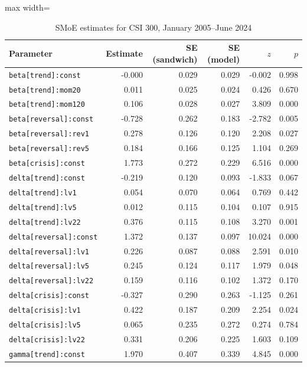 \begin{table}[!htbp]\centering\scriptsize
\caption{SMoE estimates for CSI 300, January 2005--June 2024}\label{tab:csi300_params}
\begin{adjustbox}{max width=\textwidth}
\begin{tabular}{lrrrrr}
\toprule
Parameter & Estimate & SE (sandwich) & SE (model) & $z$ & $p$\\
\midrule
\texttt{beta[trend]:const} & -0.000 & 0.029 & 0.029 & -0.002 & 0.998\\
\texttt{beta[trend]:mom20} & 0.011 & 0.025 & 0.024 & 0.426 & 0.670\\
\texttt{beta[trend]:mom120} & 0.106 & 0.028 & 0.027 & 3.809 & 0.000\\
\texttt{beta[reversal]:const} & -0.728 & 0.262 & 0.183 & -2.782 & 0.005\\
\texttt{beta[reversal]:rev1} & 0.278 & 0.126 & 0.120 & 2.208 & 0.027\\
\texttt{beta[reversal]:rev5} & 0.184 & 0.166 & 0.125 & 1.104 & 0.269\\
\texttt{beta[crisis]:const} & 1.773 & 0.272 & 0.229 & 6.516 & 0.000\\
\texttt{delta[trend]:const} & -0.219 & 0.120 & 0.093 & -1.833 & 0.067\\
\texttt{delta[trend]:lv1} & 0.054 & 0.070 & 0.064 & 0.769 & 0.442\\
\texttt{delta[trend]:lv5} & 0.012 & 0.115 & 0.104 & 0.107 & 0.915\\
\texttt{delta[trend]:lv22} & 0.376 & 0.115 & 0.108 & 3.270 & 0.001\\
\texttt{delta[reversal]:const} & 1.372 & 0.137 & 0.097 & 10.024 & 0.000\\
\texttt{delta[reversal]:lv1} & 0.226 & 0.087 & 0.088 & 2.591 & 0.010\\
\texttt{delta[reversal]:lv5} & 0.245 & 0.124 & 0.117 & 1.979 & 0.048\\
\texttt{delta[reversal]:lv22} & 0.159 & 0.116 & 0.102 & 1.372 & 0.170\\
\texttt{delta[crisis]:const} & -0.327 & 0.290 & 0.263 & -1.125 & 0.261\\
\texttt{delta[crisis]:lv1} & 0.422 & 0.187 & 0.209 & 2.254 & 0.024\\
\texttt{delta[crisis]:lv5} & 0.065 & 0.235 & 0.272 & 0.274 & 0.784\\
\texttt{delta[crisis]:lv22} & 0.331 & 0.206 & 0.225 & 1.603 & 0.109\\
\texttt{gamma[trend]:const} & 1.970 & 0.407 & 0.339 & 4.845 & 0.000\\

\end{tabular}
\end{adjustbox}
\end{table}
